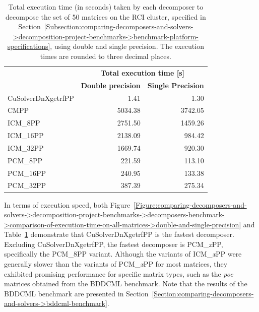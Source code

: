 \begin{table}[ht!]
	\centering
	\begin{tabular}{|l|r|r|}
		\hline
		\rowcolor[HTML]{C0C0C0} 
		\multicolumn{1}{|c|}{\cellcolor[HTML]{C0C0C0}}                                      & \multicolumn{2}{c|}{\cellcolor[HTML]{C0C0C0}\textbf{Total execution time {[}s{]}}}                                                                        \\ \cline{2-3} 
		\rowcolor[HTML]{EFEFEF} 
		\multicolumn{1}{|c|}{\multirow{-2}{*}{\cellcolor[HTML]{C0C0C0}\textbf{Decomposer}}} & \multicolumn{1}{l|}{\cellcolor[HTML]{EFEFEF}\textbf{Double precision}} & \multicolumn{1}{l|}{\cellcolor[HTML]{EFEFEF}\textbf{Single Precision}} \\ \hline
		\multicolumn{1}{|l|}{CuSolverDnXgetrfPP} &    1.41 &    1.30 \\
		\multicolumn{1}{|l|}{CMPP}               & 5034.38 & 3742.05 \\
		\multicolumn{1}{|l|}{ICM\_8PP}           & 2751.50 & 1459.26 \\
		\multicolumn{1}{|l|}{ICM\_16PP}          & 2138.09 &  984.42 \\
		\multicolumn{1}{|l|}{ICM\_32PP}          & 1669.74 &  920.30 \\
		\multicolumn{1}{|l|}{PCM\_8PP}           &  221.59 &  113.10 \\
		\multicolumn{1}{|l|}{PCM\_16PP}          &  240.95 &  133.38 \\
		\multicolumn{1}{|l|}{PCM\_32PP}          &  387.39 &  275.34 \\ \hline
	\end{tabular}
	\caption{Total execution time (in seconds) taken by each decomposer to decompose the set of 50 matrices on the RCI cluster, specified in Section~\ref{Subsection:comparing-decomposers-and-solvers->decomposition-project-benchmarks->benchmark-platform-specifications}, using double and single precision. The execution times are rounded to three decimal places.}
	\label{Table:comparing-decomposers-and-solvers->decomposition-project-benchmarks->decomposers-benchmark->comparison-of-execution-time-on-all-matrices->total-execution-of-decomposers-on-set-of-50-matrices}
\end{table}

In terms of execution speed, both Figure~\ref{Figure:comparing-decomposers-and-solvers->decomposition-project-benchmarks->decomposers-benchmark->comparison-of-execution-time-on-all-matrices->double-and-single-precision} and Table~\ref{Table:comparing-decomposers-and-solvers->decomposition-project-benchmarks->decomposers-benchmark->comparison-of-execution-time-on-all-matrices->total-execution-of-decomposers-on-set-of-50-matrices} demonstrate that CuSolverDnXgetrfPP is the fastest decomposer. Excluding CuSolverDnXgetrfPP, the fastest decomposer is PCM\_\textit{x}PP, specifically the PCM\_8PP variant. Although the variants of ICM\_\textit{x}PP were generally slower than the variants of PCM\_\textit{x}PP for most matrices, they exhibited promising performance for specific matrix types, such as the \textit{poc} matrices obtained from the BDDCML benchmark. Note that the results of the BDDCML benchmark are presented in Section~\ref{Section:comparing-decomposers-and-solvers->bddcml-benchmark}.


